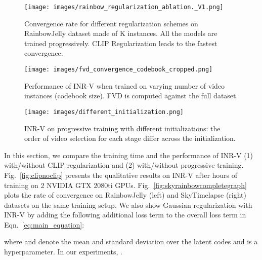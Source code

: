 \documentclass[10pt]{article} \usepackage[accepted]{tmlr}
\begin{document}
\begin{wrapfigure}[52]{r}{0.45\textwidth}
    \centering
    \vspace{2pt}
    \texttt{[image: images/rainbow\_regularization\_ablation.\_V1.png]}
    \caption{\small Convergence rate for different regularization schemes on RainbowJelly dataset made of K instances. All the models are trained progressively. CLIP Regularization leads to the fastest convergence. }
    \label{fig:rainbowgraph}
    


\vspace{7pt}
    \texttt{[image: images/fvd\_convergence\_codebook\_cropped.png]}
    \caption{Performance of INR-V when trained on varying number of video instances (codebook size). FVD is computed against the full dataset.}
    \label{fig:codebooksize-rainbow}


\vspace{7pt}
    \texttt{[image: images/different\_initialization.png]}
    \caption{INR-V on progressive training with different initializations: the order of video selection for each stage differ across the initialization.}
    \label{fig:diff-progtraining}
\end{wrapfigure}
In this section, we compare the training time and the performance of INR-V (1) with/without CLIP regularization and (2) with/without progressive training. Fig.~\ref{fig:clipnoclip} presents the qualitative results on INR-V after  hours of training on 2 NVIDIA GTX 2080ti GPUs. Fig.~\ref{fig:skyrainbowcompletegraph} plots the rate of convergence on RainbowJelly (left) and SkyTimelapse (right) datasets on the same training setup. We also show Gaussian regularization with INR-V by adding the following additional loss term to the overall loss term in Eqn.~\ref{eq:main_equation}: 

where  and  denote the mean and standard deviation over the latent codes  and  is a hyperparameter. In our experiments, .
\end{document}
